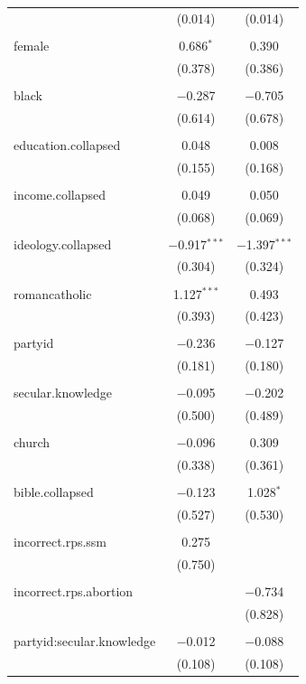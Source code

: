 \documentclass[12pt,letterpaper]{article}
\begin{document}
\begin{description}
\begin{table}[H]
\begin{tabular}{@{\extracolsep{5pt}}lcc}
		& (0.014) & (0.014) \\ 
		& & \\ 
		female & 0.686$^{*}$ & 0.390 \\ 
		& (0.378) & (0.386) \\ 
		& & \\ 
		black & $-$0.287 & $-$0.705 \\ 
		& (0.614) & (0.678) \\ 
		& & \\ 
		education.collapsed & 0.048 & 0.008 \\ 
		& (0.155) & (0.168) \\ 
		& & \\ 
		income.collapsed & 0.049 & 0.050 \\ 
		& (0.068) & (0.069) \\ 
		& & \\ 
		ideology.collapsed & $-$0.917$^{***}$ & $-$1.397$^{***}$ \\ 
		& (0.304) & (0.324) \\ 
		& & \\ 
		romancatholic & 1.127$^{***}$ & 0.493 \\ 
		& (0.393) & (0.423) \\ 
		& & \\ 
		partyid & $-$0.236 & $-$0.127 \\ 
		& (0.181) & (0.180) \\ 
		& & \\ 
		secular.knowledge & $-$0.095 & $-$0.202 \\ 
		& (0.500) & (0.489) \\ 
		& & \\ 
		church & $-$0.096 & 0.309 \\ 
		& (0.338) & (0.361) \\ 
		& & \\ 
		bible.collapsed & $-$0.123 & 1.028$^{*}$ \\ 
		& (0.527) & (0.530) \\ 
		& & \\ 
		incorrect.rps.ssm & 0.275 &  \\ 
		& (0.750) &  \\ 
		& & \\ 
		incorrect.rps.abortion &  & $-$0.734 \\ 
		&  & (0.828) \\ 
		& & \\ 
		partyid:secular.knowledge & $-$0.012 & $-$0.088 \\ 
		& (0.108) & (0.108) \\ 

\end{tabular}
\end{table}
\end{description}
\end{document}
